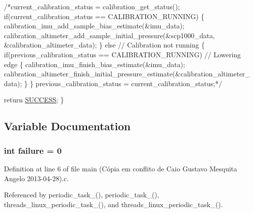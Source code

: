 \begin{DoxyCode}
    \textcolor{comment}{/*current\_calibration\_status = calibration\_get\_status();}
\textcolor{comment}{    if(current\_calibration\_status == CALIBRATION\_RUNNING)}
\textcolor{comment}{    \{}
\textcolor{comment}{        calibration\_imu\_add\_sample\_bias\_estimate(&imu\_data);}
\textcolor{comment}{        calibration\_altimeter\_add\_sample\_initial\_pressure(&scp1000\_data,
       &calibration\_altimeter\_data);}
\textcolor{comment}{    \}}
\textcolor{comment}{    else // Calibration not running}
\textcolor{comment}{    \{}
\textcolor{comment}{        if(previous\_calibration\_status == CALIBRATION\_RUNNING) // Lowering edge}
\textcolor{comment}{        \{}
\textcolor{comment}{            calibration\_imu\_finish\_bias\_estimate(&imu\_data);}
\textcolor{comment}{           
       calibration\_altimeter\_finish\_initial\_pressure\_estimate(&calibration\_altimeter\_data);}
\textcolor{comment}{        \}}
\textcolor{comment}{    \}}
\textcolor{comment}{    previous\_calibration\_status = current\_calibration\_status;*/}

    \textcolor{keywordflow}{return} \hyperlink{communication_01_07C_xC3_xB3pia_01em_01conflito_01de_01Caio_01Gustavo_01Mesquita_01Angelo_012013-04-28_08_8h_aa90cac659d18e8ef6294c7ae337f6b58}{SUCCESS};
\}
\end{DoxyCode}


\subsection{Variable Documentation}
\hypertarget{main_01_07C_xC3_xB3pia_01em_01conflito_01de_01Caio_01Gustavo_01Mesquita_01Angelo_012013-04-28_08_8c_a4f35e5ea2395561d0bd3b2f45612dc2c}{
\subsubsection[{failure}]{\setlength{\rightskip}{0pt plus 5cm}int failure = 0}}\label{main_01_07C_xC3_xB3pia_01em_01conflito_01de_01Caio_01Gustavo_01Mesquita_01Angelo_012013-04-28_08_8c_a4f35e5ea2395561d0bd3b2f45612dc2c}


Definition at line 6 of file main (\-Cópia em conflito de Caio Gustavo Mesquita Angelo 2013-\/04-\/28).\-c.



Referenced by periodic\-\_\-task\-\_(), periodic\-\_\-task\-\_(), threads\-\_\-linux\-\_\-periodic\-\_\-task\-\_(), and threads\-\_\-linux\-\_\-periodic\-\_\-task\-\_().

